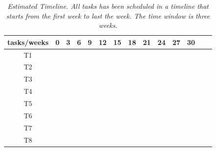 \begin{table}[H]
  \centering
  \label{tab:340W}
  \begin{tabular}{| c | c | c | c |c | c | c |c | c | c |c | c | c |c | }
    \hline
    tasks/weeks & 0 & 3 & 6 & 9 & 12 & 15 & 18 & 21 & 24 & 27 & 30 \\
    \hline
    T1  & \cellcolor{red!50} &   &   &   &   &   &   &   &   &   &     \\
    \hline
    T2  &   & \cellcolor{lime!50}  &  &  &   &   &   &    &  &  &   \\
    \hline
    T3  &  &  & \cellcolor{blue!40} &  &   &   &   &   &  &  & \\
    \hline
    T4  &  &  &  & \cellcolor{teal!50} & \cellcolor{teal!50} &  &  &   &   &   &   \\
    \hline
    T5  &  &  &  &  & \cellcolor{amber!30} & \cellcolor{amber!30} & \cellcolor{amber!30}  & \cellcolor{amber!30} & \cellcolor{amber!30}  &  & \\
    \hline
    T6  &  &  &  &  & \cellcolor{black!70} & \cellcolor{black!70} & \cellcolor{black!70}  & \cellcolor{black!70} & \cellcolor{black!70}  &  \cellcolor{black!70} & \\
    \hline
    T7  &   &  &  &  &  &  &  &   &    & \cellcolor{gray!50} & \\
    \hline
    T8  &   &  &  &  &  & \cellcolor{orange!50}  &  &   &   & \cellcolor{orange!50} & \cellcolor{orange!50} \\
    \hline
  \end{tabular}
  \caption[Estimated Timeline.]
  {\textit{Estimated Timeline.
  All tasks has been scheduled in a timeline that starts from the first week to last the week.
  The time window is three weeks.
  }}
\end{table}
